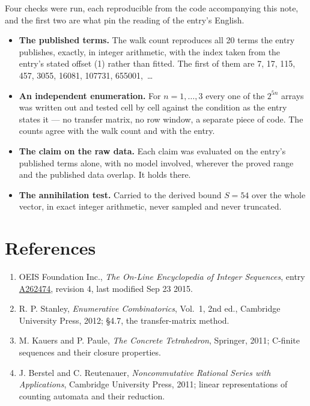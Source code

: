 \documentclass[11pt]{article}
\theoremstyle{definition}
\begin{document}
Four checks were run, each reproducible from the code accompanying this note, and the first two are what pin the reading of the entry's English.

\begin{itemize}

\item {\bfseries The published terms.} The walk count reproduces all 20 terms the entry publishes, exactly, in integer arithmetic, with the index taken from the entry's stated offset (1) rather than fitted. The first of them are 7, 17, 115, 457, 3055, 16081, 107731, 655001,~\dots

\item {\bfseries An independent enumeration.} For $n = 1,\dots,3$ every one of the $2^{5n}$ arrays was written out and tested cell by cell against the condition as the entry states it --- no transfer matrix, no row window, a separate piece of code. The counts agree with the walk count and with the entry.

\item {\bfseries The claim on the raw data.} Each claim was evaluated on the entry's published terms alone, with no model involved, wherever the proved range and the published data overlap. It holds there.

\item {\bfseries The annihilation test.} Carried to the derived bound $S = 54$ over the whole vector, in exact integer arithmetic, never sampled and never truncated.

\end{itemize}

\section{References}

\begin{enumerate}

\item OEIS Foundation Inc., \emph{The On-Line Encyclopedia of Integer Sequences}, entry \href{https://oeis.org/A262474}{A262474}, revision 4, last modified Sep 23 2015.

\item R. P. Stanley, \emph{Enumerative Combinatorics}, Vol.~1, 2nd ed., Cambridge University Press, 2012; \S4.7, the transfer-matrix method.

\item M. Kauers and P. Paule, \emph{The Concrete Tetrahedron}, Springer, 2011; C-finite sequences and their closure properties.

\item J. Berstel and C. Reutenauer, \emph{Noncommutative Rational Series with Applications}, Cambridge University Press, 2011; linear representations of counting automata and their reduction.

\end{enumerate}
\end{document}
